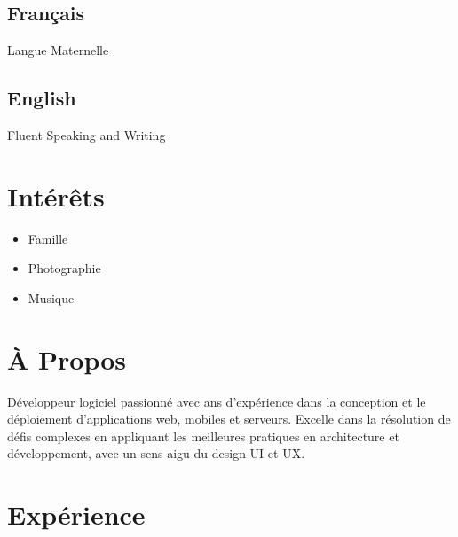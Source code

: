 \documentclass{article}
\begin{document}
\begin{paracol}{2}
\begin{leftcolumn}
    \subsection{Français}
    Langue Maternelle

    \vspace{0.5em}

    \subsection{English}
    Fluent Speaking and Writing

    \section{Intérêts}

    \begin{itemize}
      \item Famille
      \item Photographie
      \item Musique
    \end{itemize}


  \end{leftcolumn}
  \begin{rightcolumn}

    \vspace{-2.5em}
    \section{À Propos}

    Développeur logiciel passionné avec  ans d’expérience dans la conception et le
    déploiement d’applications web, mobiles et serveurs. Excelle dans la résolution de défis complexes en
    appliquant les meilleures pratiques en architecture et développement, avec un sens aigu du design UI et UX. 

    \section{Expérience}


\end{rightcolumn}
\end{paracol}
\end{document}
